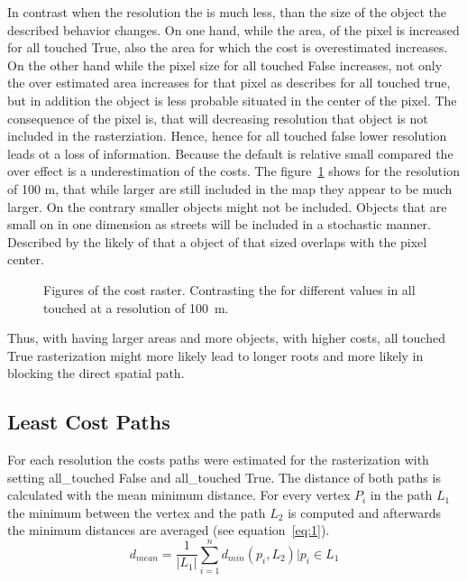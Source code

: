 In contrast when the resolution the is much less, than the size of the object the described behavior changes.
On one hand, while the area, of the pixel is increased for all touched True, also the area for which the cost is overestimated increases.
On the other hand while the pixel size for all touched  False increases, not only the over estimated area increases for that pixel as describes for all touched true, but in addition the object is less probable situated in the center of the pixel.
The consequence of the pixel is, that will decreasing resolution that object is not included in the rasterziation.
Hence, hence for all touched false lower resolution  leads ot a loss of information.
Because the default is relative small compared the over effect is a underestimation of the costs.
The figure~\ref{fig:costs_100m} shows for the resolution of 100 m, that while larger are still included in the map they appear to be much larger.
On the contrary smaller objects might not be included.
Objects that are small on in one dimension as streets will be included in a stochastic manner.
Described by the likely of that a object of that sized overlaps with the pixel center.
\begin{figure}
	\centering

	\qquad
	\caption{Figures of the cost raster. Contrasting the for different values in all touched at a resolution of 100~m.}
	\label{fig:costs_100m}
\end{figure}
Thus, with having larger areas and more objects, with higher costs, all touched True rasterization might more likely lead to longer roots and more likely in blocking the  direct spatial path.

\subsection{Least Cost Paths}\label{subsec:least-cost-paths}
For each resolution the costs paths were estimated for the rasterization with setting all\_touched False
and all\_touched True.
The distance of both paths is calculated with the mean minimum distance.
For every vertex $P_i$ in the path $L_1$ the minimum between the vertex and the path $L_2$
is computed and afterwards the minimum distances are averaged (see equation~\ref{eq:1}).
\begin{equation}
	\label{eq:1}
	d_{mean} = \frac{1}{|L_1|} \sum_{i=1}^{n} d_{min}(p_i, L_2) \bigg\vert p_i \in L_1
\end{equation}

